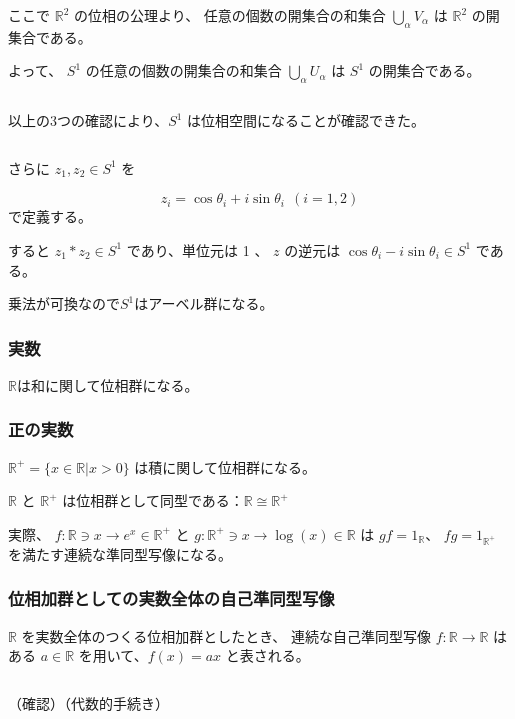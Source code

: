 \documentclass[uplatex,a4j,12pt,dvipdfmx]{jsarticle}
\begin{document}
ここで $\mathbb{R}^{2}$ の位相の公理より、
任意の個数の開集合の和集合
$\bigcup_{\alpha} V_{\alpha}$
は $\mathbb{R}^{2}$ の開集合である。

よって、
$S^{1}$ の任意の個数の開集合の和集合
$\bigcup_{\alpha} U_{\alpha}$ は $S^{1}$ の開集合である。

${}$

以上の3つの確認により、$S^{1}$ は位相空間になることが確認できた。

${}$

さらに $z_{1},z_{2} \in S^{1}$ を

\[
	z_{i} = \cos \theta_{i} + i \sin \theta_{i} \ \ (i=1,2)
\]
で定義する。

すると $z_{1} * z_{2} \in S^{1}$ であり、単位元は 1 、
$z$ の逆元は $\cos \theta_{i} - i \sin \theta_{i} \in S^{1}$ である。

乗法が可換なので$S^{1}$はアーベル群になる。

\subsubsection{実数}

$\mathbb{R}$は和に関して位相群になる。

\subsubsection{正の実数}

$\mathbb{R}^{+} = \{ x \in \mathbb{R} | x > 0 \}$
は積に関して位相群になる。

$\mathbb{R}$ と $\mathbb{R}^{+}$ は位相群として同型である：$\mathbb{R} \cong \mathbb{R}^{+}$

実際、
$f: \mathbb{R} \ni x \to e^{x} \in \mathbb{R}^{+}$
と
$g: \mathbb{R}^{+} \ni x \to \log(x) \in \mathbb{R}$
は
$gf=1_{\mathbb{R}}$、
$fg=1_{\mathbb{R}^{+}}$
を満たす連続な準同型写像になる。


\subsubsection{位相加群としての実数全体の自己準同型写像}

$\mathbb{R}$ を実数全体のつくる位相加群としたとき、
連続な自己準同型写像
$f: \mathbb{R} \to \mathbb{R}$
はある $a \in \mathbb{R}$ を用いて、$f(x) = ax$ と表される。

${}$

（確認）（代数的手続き）

${}$
\end{document}
